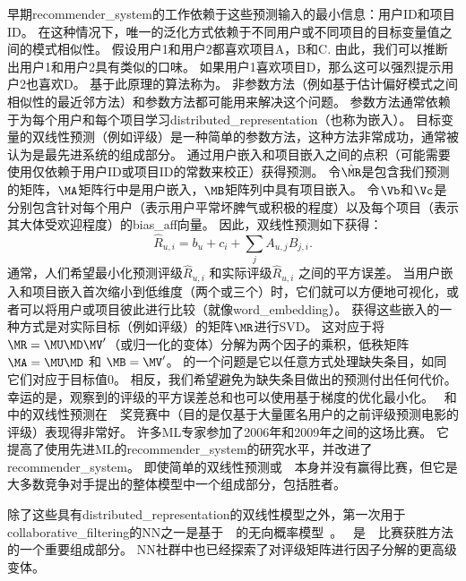 早期\gls{recommender_system}的工作依赖于这些预测输入的最小信息：用户ID和项目ID。
在这种情况下，唯一的泛化方式依赖于不同用户或不同项目的目标变量值之间的模式相似性。
假设用户1和用户2都喜欢项目A，B和C.
由此，我们可以推断出用户1和用户2具有类似的口味。
如果用户1喜欢项目D，那么这可以强烈提示用户2也喜欢D。
基于此原理的算法称为。
非参数方法（例如基于估计偏好模式之间相似性的最近邻方法）和参数方法都可能用来解决这个问题。
参数方法通常依赖于为每个用户和每个项目学习\gls{distributed_representation}（也称为嵌入）。
目标变量的双线性预测（例如评级）是一种简单的参数方法，这种方法非常成功，通常被认为是最先进系统的组成部分。
通过用户嵌入和项目嵌入之间的点积（可能需要使用仅依赖于用户ID或项目ID的常数来校正）获得预测。
令$\hat{\MR}$是包含我们预测的矩阵，$\MA$矩阵行中是用户嵌入，$\MB$矩阵列中具有项目嵌入。
令$\Vb$和$\Vc$是分别包含针对每个用户（表示用户平常坏脾气或积极的程度）以及每个项目（表示其大体受欢迎程度）的\gls{bias_aff}向量。
因此，双线性预测如下获得：
\begin{equation}
\label{eq:bilinear-prediction}
 \hat{R}_{u,i} = b_u + c_i + \sum_j A_{u,j} B_{j,i}.
\end{equation}
通常，人们希望最小化预测评级$\hat{R}_{u,i}$ 和实际评级$\hat{R}_{u,i}$ 之间的平方误差。
当用户嵌入和项目嵌入首次缩小到低维度（两个或三个）时，它们就可以方便地可视化，或者可以将用户或项目彼此进行比较（就像\gls{word_embedding}）。
获得这些嵌入的一种方式是对实际目标（例如评级）的矩阵$\MR$进行\gls{SVD}。
这对应于将$\MR = \MU \MD \MV'$（或归一化的变体）分解为两个因子的乘积，低秩矩阵 $\MA=\MU \MD$ 和 $\MB = \MV'$。
的一个问题是它以任意方式处理缺失条目，如同它们对应于目标值0。
相反，我们希望避免为缺失条目做出的预测付出任何代价。
幸运的是，观察到的评级的平方误差总和也可以使用基于梯度的优化最小化。
~和中的双线性预测在~~奖竞赛中（目的是仅基于大量匿名用户的之前评级预测电影的评级）表现得非常好\citep{bennett2007netflix}。
许多\gls{ML}专家参加了2006年和2009年之间的这场比赛。
它提高了使用先进\gls{ML}的\gls{recommender_system}的研究水平，并改进了\gls{recommender_system}。
即使简单的双线性预测或~~本身并没有赢得比赛，但它是大多数竞争对手提出的整体模型中一个组成部分，包括胜者\citep{BigChaos-Netflix2009,Koren09}。


除了这些具有\gls{distributed_representation}的双线性模型之外，第一次用于\gls{collaborative_filtering}的\gls{NN}之一是基于~~的无向概率模型~\citep{Salakhutdinov-2007-short}。
~是~~比赛获胜方法的一个重要组成部分\citep{BigChaos-Netflix2009,Koren09}。
\gls{NN}社群中也已经探索了对评级矩阵进行因子分解的更高级变体\citep{Salakhutdinov2008-small}。

